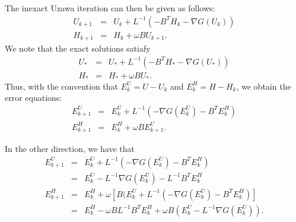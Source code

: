 \begin{itemize}
The inexact Uzawa iteration can then be given as follows: 
\begin{eqnarray}
U_{k+1} &=& U_k + L^{-1} (-B^T H_k - \nabla G( U_k)) \\
H_{k+1} &=& H_k + \omega B U_{k+1}. 
\end{eqnarray}
We note that the exact solutions satiafy \begin{eqnarray}
U_{*} &=& U_{*} + L^{-1} (-B^T H_{*}-\nabla G (U_{*})) \\
H_{*} &=& H_{*} + \omega B U_{*}. 
\end{eqnarray}
Thus, with the convention that $E_{k}^U = U - U_k$ and $E_{k}^H = H - H_k$, we obtain the error equations: 
\begin{eqnarray}
E^U_{k+1} &=& E^U_k + L^{-1} (-\nabla G(E^U_k) -B^T E^H_k) \\
E^H_{k+1} &=& E^H_k + \omega B E^U_{k+1}. 
\end{eqnarray}
\begin{comment} 
In the matrix form, we have 
\begin{equation}
    \begin{pmatrix} 
     I  & 0 \\
      -\omega B & I
    \end{pmatrix} 
        \begin{pmatrix} 
      E^U_{k+1} \\
       E^H_{k+1}
    \end{pmatrix}  = 
        \begin{pmatrix} 
     I - L^{-1} A & -L^{-1} B^T \\
    0 & I
    \end{pmatrix} 
            \begin{pmatrix} 
      E^U_{k} \\
       E^H_{k}
    \end{pmatrix} 
\end{equation}
\end{comment} 
In the other direction, we have that 
\begin{eqnarray}
E^U_{k+1} &=& E^U_k + L^{-1} (- \nabla G(E^U_k) - B^T E^H_k) \\
          &=& E^U_k - L^{-1} \nabla G(E^U_k) - L^{-1} B^T E^H_k \\
E^H_{k+1} &=& E^H_k + \omega \left [ B (E^U_k + L^{-1} (- \nabla G(E_k^U) - B^T E^H_k) \right ] \\
&=& E^H_k - \omega B L^{-1} B^T E_k^H + \omega B (E_k^U - L^{-1} \nabla G(E_k^U)). 
\end{eqnarray}


\end{itemize}
